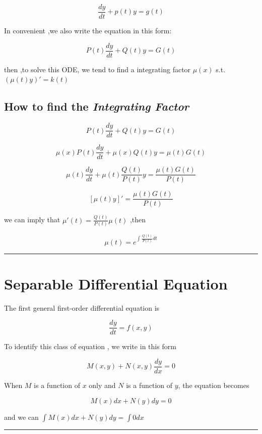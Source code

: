 \documentclass[12pt, a4paper]{article}
\theoremstyle{break}
\begin{document}
\[
  \frac{dy}{dt} + p(t) y = g(t)
\]

In convenient ,we also write the equation in this form:

\[
P(t)\frac{dy}{dt} + Q(t) y = G(t)
\]

then ,to solve this ODE, we tend to find a integrating factor \(\mu (x)\) s.t. \((\mu (t) y)' = k(t)\)

\subsection{\texorpdfstring{How to find the \emph{Integrating Factor }}{How to find the Integrating Factor }}\label{how-to-find-the-integrating-factor}

\[
P(t) \frac{dy}{dt} + Q(t)y = G(t)
\]

\[
\mu (x) P(t) \frac{dy}{dt} + \mu (x) Q(t)y = \mu (t)G(t)
\]

\[
\mu (t) \frac{dy}{dt} + \mu (t) \frac {Q(t)}{P(t)}y = \frac {\mu (t) G(t)}{P(t)}
\]

\[
[\mu (t) y]' = \frac{\mu (t) G(t)}{P(t)}
\]

we can imply that \(\mu '(t) = \frac{Q(t)}{P(t)} \mu (t)\) ,then

\[
\mu (t) = e^{\int_{}^{} \frac{Q(t)}{P(t)} dt}
\]

\begin{center}\rule{0.5\linewidth}{0.5pt}\end{center}

\section{Separable Differential Equation}\label{separable-differential-equation}

The first general first-order differential equation is

\[
\frac{dy}{dt} = f(x ,y)
\]

To identify this class of equation , we write in this form

\[
M(x, y) + N(x ,y)\frac{dy}{dx} = 0
\]

When \(M\) is a function of \(x\) only and \(N\) is a function of \(y\), the equation becomes

\[
M(x)dx+ N(y)dy = 0 
\]

and we can \(\int M(x)dx + N(y)dy = \int 0 dx\)

\begin{center}\rule{0.5\linewidth}{0.5pt}\end{center}
\end{document}
